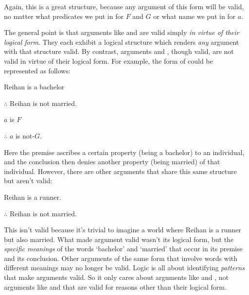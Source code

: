 \noindent Again, this is a great structure, because any argument of this form will be valid, no matter what predicates we put in for $F$ and $G$ or what name we put in for $a$.


The general point is that arguments like  and   are valid simply \emph{in virtue of their logical form}.  They each exhibit a logical structure which renders \emph{any} argument with that structure valid.  By contrast, arguments   and , though valid, are not valid in virtue of their logical form.  For example, the form of  could be represented as follows:

\begin{multicols}{2}

\begin{earg}
\item[\eref{exarg6}] Reihan is a bachelor
\item[] $\therefore$ Reihan is not married.
\end{earg}

\columnbreak

\begin{earg}
\item[] $a$ is $F$
\item[] $\therefore$ $a$ is not-$G$.
\end{earg}
\end{multicols}
\noindent Here the premise ascribes a certain property (being a bachelor) to an individual, and the conclusion then denies another property (being married) of that individual. However, there are other arguments that share this same structure but aren't valid:
\begin{earg}
\item[] Reihan is a runner.
\item[] $\therefore$ Reihan is not married.
\end{earg}
This isn't valid because it's trivial to imagine a world where Reihan is a runner but also married.  What made argument  valid wasn't its logical form, but the \emph{specific meanings} of the words `bachelor' and `married' that occur in its premise and its conclusion. Other arguments of the same form that involve words with different meanings may no longer be valid. Logic is all about identifying \emph{patterns} that make arguments valid.  So it only cares about  arguments like  and , not arguments like  and  that are valid for reasons other than their logical form. 




